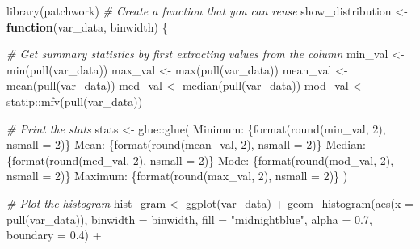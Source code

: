 \documentclass[
]{article}
\newenvironment{Shaded}{\begin{snugshade}}{\end{snugshade}}
\newcommand{\AttributeTok}[1]{\textcolor[rgb]{0.77,0.63,0.00}{#1}}
\newcommand{\CommentTok}[1]{\textcolor[rgb]{0.56,0.35,0.01}{\textit{#1}}}
\newcommand{\ControlFlowTok}[1]{\textcolor[rgb]{0.13,0.29,0.53}{\textbf{#1}}}
\newcommand{\FloatTok}[1]{\textcolor[rgb]{0.00,0.00,0.81}{#1}}
\newcommand{\FunctionTok}[1]{\textcolor[rgb]{0.00,0.00,0.00}{#1}}
\newcommand{\NormalTok}[1]{#1}
\newcommand{\OtherTok}[1]{\textcolor[rgb]{0.56,0.35,0.01}{#1}}
\newcommand{\SpecialCharTok}[1]{\textcolor[rgb]{0.00,0.00,0.00}{#1}}
\newcommand{\StringTok}[1]{\textcolor[rgb]{0.31,0.60,0.02}{#1}}
\begin{document}
\begin{Shaded}
\begin{Highlighting}[]
\FunctionTok{library}\NormalTok{(patchwork)}
\CommentTok{\# Create a function that you can reuse}
\NormalTok{show\_distribution }\OtherTok{\textless{}{-}} \ControlFlowTok{function}\NormalTok{(var\_data, binwidth) \{}
  
  \CommentTok{\# Get summary statistics by first extracting values from the column}
\NormalTok{  min\_val }\OtherTok{\textless{}{-}} \FunctionTok{min}\NormalTok{(}\FunctionTok{pull}\NormalTok{(var\_data))}
\NormalTok{  max\_val }\OtherTok{\textless{}{-}} \FunctionTok{max}\NormalTok{(}\FunctionTok{pull}\NormalTok{(var\_data))}
\NormalTok{  mean\_val }\OtherTok{\textless{}{-}} \FunctionTok{mean}\NormalTok{(}\FunctionTok{pull}\NormalTok{(var\_data))}
\NormalTok{  med\_val }\OtherTok{\textless{}{-}} \FunctionTok{median}\NormalTok{(}\FunctionTok{pull}\NormalTok{(var\_data))}
\NormalTok{  mod\_val }\OtherTok{\textless{}{-}}\NormalTok{ statip}\SpecialCharTok{::}\FunctionTok{mfv}\NormalTok{(}\FunctionTok{pull}\NormalTok{(var\_data))}

  \CommentTok{\# Print the stats}
\NormalTok{  stats }\OtherTok{\textless{}{-}}\NormalTok{ glue}\SpecialCharTok{::}\FunctionTok{glue}\NormalTok{(}
  \StringTok{\textquotesingle{}Minimum: \{format(round(min\_val, 2), nsmall = 2)\}}
\StringTok{   Mean: \{format(round(mean\_val, 2), nsmall = 2)\}}
\StringTok{   Median: \{format(round(med\_val, 2), nsmall = 2)\}}
\StringTok{   Mode: \{format(round(mod\_val, 2), nsmall = 2)\}}
\StringTok{   Maximum: \{format(round(max\_val, 2), nsmall = 2)\}\textquotesingle{}}
\NormalTok{  )}
  
  \CommentTok{\# Plot the histogram}
\NormalTok{  hist\_gram }\OtherTok{\textless{}{-}} \FunctionTok{ggplot}\NormalTok{(var\_data) }\SpecialCharTok{+}
  \FunctionTok{geom\_histogram}\NormalTok{(}\FunctionTok{aes}\NormalTok{(}\AttributeTok{x =} \FunctionTok{pull}\NormalTok{(var\_data)), }\AttributeTok{binwidth =}\NormalTok{ binwidth,}
                 \AttributeTok{fill =} \StringTok{"midnightblue"}\NormalTok{, }\AttributeTok{alpha =} \FloatTok{0.7}\NormalTok{, }\AttributeTok{boundary =} \FloatTok{0.4}\NormalTok{) }\SpecialCharTok{+}
    

\end{Highlighting}
\end{Shaded}
\end{document}
